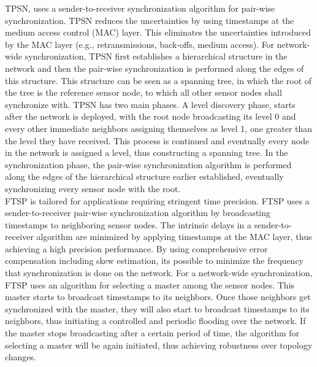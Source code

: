 TPSN, uses a sender-to-receiver synchronization algorithm for pair-wise synchronization. TPSN reduces the uncertainties by using timestamps at the medium access control (MAC) layer. This eliminates the uncertainties introduced by the MAC layer (e.g., retransmissions, back-offs, medium access). For network-wide synchronization, TPSN first establishes a hierarchical structure in the network and then the pair-wise synchronization is performed along the edges of this structure. This structure can be seen as a spanning tree, in which the root of the tree is the reference sensor node, to which all other sensor nodes shall synchronize with.
TPSN has two main phases. A level discovery phase, starts after the network is deployed, with the root node broadcasting its level 0 and every other immediate neighbors assigning themselves as level 1, one greater than the level they have received. This process is continued and eventually every node in the network is assigned a level, thus constructing a spanning tree. In the synchronization phase, the pair-wise synchronization algorithm is performed along the edges of the hierarchical structure earlier established, eventually synchronizing every sensor node with the root.\\

FTSP is tailored for applications requiring stringent time precision. FTSP uses a sender-to-receiver pair-wise synchronization algorithm by broadcasting timestamps to neighboring sensor nodes. The intrinsic delays in a sender-to-receiver algorithm are minimized by applying timestamps at the MAC layer, thus achieving a high precision performance. By using comprehensive error compensation including skew estimation, its possible to minimize the frequency that synchronization is done on the network. For a network-wide synchronization, FTSP uses an algorithm for selecting a master among the sensor nodes. This master starts to broadcast timestamps to its neighbors. Once those neighbors get synchronized with the master, they will also start to broadcast timestamps to its neighbors, thus initiating a controlled and periodic flooding over the network. If the master stops broadcasting after a certain period of time, the algorithm for selecting a master will be again initiated, thus achieving robustness over topology changes.\\

